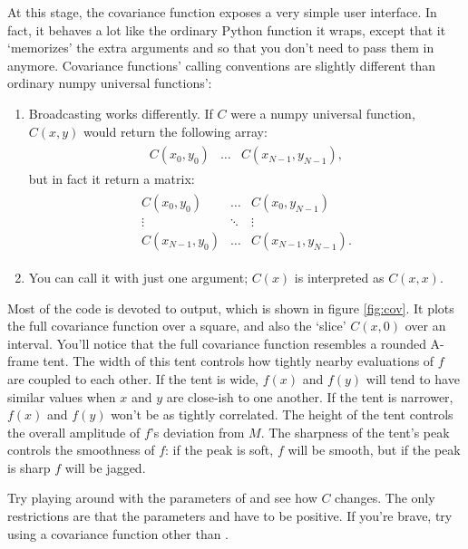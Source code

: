 \documentclass{manual}
\begin{document}
At this stage, the covariance function exposes a very simple user interface. In fact, it behaves a lot like the ordinary Python function it wraps, except that it `memorizes' the extra arguments  and  so that you don't need to pass them in anymore. Covariance functions' calling conventions are slightly different than ordinary numpy universal functions':
\begin{enumerate}
	\item Broadcasting works differently. If $C$ were a numpy universal function, $C(x,y)$ would return the following array:
	\begin{eqnarray*}
		\begin{array}{ccc}
			C(x_0,y_0)& \ldots& C(x_{N-1},y_{N-1}),
		\end{array}
	\end{eqnarray*}
	but in fact it return a matrix:
	\begin{eqnarray*}
		\begin{array}{ccc}
			C(x_0,y_0)& \ldots& C(x_0,y_{N-1})\\
			\vdots&\ddots&\vdots\\
			C(x_{N-1},y_0)& \ldots& C(x_{N-1},y_{N-1}).
		\end{array}		
	\end{eqnarray*}
	\item You can call it with just one argument; $C(x)$ is interpreted as $C(x,x)$.
\end{enumerate}

Most of the code is devoted to output, which is shown in figure \ref{fig:cov}. It plots the full covariance function over a square, and also the `slice' $C(x,0)$ over an interval. You'll notice that the full covariance function resembles a rounded A-frame tent. The width of this tent controls how tightly nearby evaluations of $f$ are coupled to each other. If the tent is wide, $f(x)$ and $f(y)$ will tend to have similar values when $x$ and $y$ are close-ish to one another. If the tent is narrower, $f(x)$ and $f(y)$ won't be as tightly correlated. The height of the tent controls the overall amplitude of $f$'s deviation from $M$. The sharpness of the tent's peak controls the smoothness of $f$: if the peak is soft, $f$ will be smooth, but if the peak is sharp $f$ will be jagged.

Try playing around with the parameters of  and see how $C$ changes. The only restrictions are that the parameters  and  have to be positive. If you're brave, try using a covariance function other than . 
\end{document}
